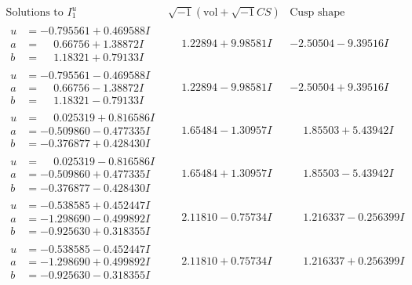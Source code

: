 \documentclass[1p]{elsarticle_modified}
\theoremstyle{definition}
\newcommand{\I}{\sqrt{-1}}
\begin{document}
$$\begin{array}{c|c|c}  
\text{Solutions to }I^u_{1}& \I (\text{vol} + \sqrt{-1}CS) & \text{Cusp shape}\\
 \hline 
\begin{aligned}
u &= -0.795561 + 0.469588 I \\
a &= \phantom{-}0.66756 + 1.38872 I \\
b &= \phantom{-}1.18321 + 0.79133 I\end{aligned}
 & \phantom{-}1.22894 + 9.98581 I & -2.50504 - 9.39516 I \\ \hline\begin{aligned}
u &= -0.795561 - 0.469588 I \\
a &= \phantom{-}0.66756 - 1.38872 I \\
b &= \phantom{-}1.18321 - 0.79133 I\end{aligned}
 & \phantom{-}1.22894 - 9.98581 I & -2.50504 + 9.39516 I \\ \hline\begin{aligned}
u &= \phantom{-}0.025319 + 0.816586 I \\
a &= -0.509860 - 0.477335 I \\
b &= -0.376877 + 0.428430 I\end{aligned}
 & \phantom{-}1.65484 - 1.30957 I & \phantom{-}1.85503 + 5.43942 I \\ \hline\begin{aligned}
u &= \phantom{-}0.025319 - 0.816586 I \\
a &= -0.509860 + 0.477335 I \\
b &= -0.376877 - 0.428430 I\end{aligned}
 & \phantom{-}1.65484 + 1.30957 I & \phantom{-}1.85503 - 5.43942 I \\ \hline\begin{aligned}
u &= -0.538585 + 0.452447 I \\
a &= -1.298690 - 0.499892 I \\
b &= -0.925630 + 0.318355 I\end{aligned}
 & \phantom{-}2.11810 - 0.75734 I & \phantom{-}1.216337 - 0.256399 I \\ \hline\begin{aligned}
u &= -0.538585 - 0.452447 I \\
a &= -1.298690 + 0.499892 I \\
b &= -0.925630 - 0.318355 I\end{aligned}
 & \phantom{-}2.11810 + 0.75734 I & \phantom{-}1.216337 + 0.256399 I \\ \hline\begin{aligned}

\end{aligned}
\end{array}$$
\end{document}
